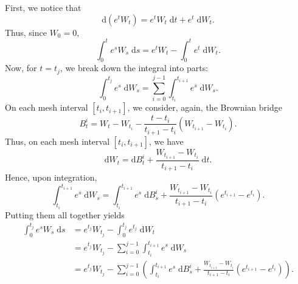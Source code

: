 \documentclass[reqno,12pt]{amsart}
\theoremstyle{plain}%
\theoremstyle{definition}
\begin{document}
First, we notice that
\[
    \mathrm{d}(e^tW_t) = e^t W_t\;\mathrm{d}t + e^t\;\mathrm{d}W_t.
\]
Thus, since $W_0 = 0$,
\[
    \int_0^t e^s W_s \;\mathrm{d}s = e^tW_t - \int_0^t e^t\;\mathrm{d}W_t.
\]
Now, for $t=t_j$, we break down the integral into parts:
\begin{equation}
    \int_0^{t_j} e^s \;\mathrm{d}W_s = \sum_{i = 0}^{j-1} \int_{t_i}^{t_{i+1}} e^s \;\mathrm{d}W_s.
\end{equation}
On each mesh interval $[t_i, t_{i+1}]$, we consider, again, the Brownian bridge
\begin{equation}
    B_t^i = W_t - W_{t_i} - \frac{t - t_i}{t_{i+1}-t_i}(W_{t_{i+1}} - W_{t_i}).
\end{equation}
Thus, on each mesh interval $[t_i, t_{i+1}]$, we have
\[
    \mathrm{d}W_t = \mathrm{d}B_t^i + \frac{W_{t_{i+1}} - W_{t_i}}{t_{i+1}-t_i} \;\mathrm{d}t.
\]
Hence, upon integration,
\[
    \int_{t_i}^{t_{i+1}} e^s \;\mathrm{d}W_s = \int_{t_i}^{t_{i+1}} e^s \;\mathrm{d}B_s^i + \frac{W_{t_{i+1}} - W_{t_i}}{t_{i+1}-t_i}\left(e^{t_{i+1}} - e^{t_i}\right).
\]
Putting them all together yields
\begin{align*}
    \int_0^{t_j} e^s W_s \;\mathrm{d}s & = e^{t_j}W_{t_j} - \int_0^{t_j} e^{t_j}\;\mathrm{d}W_t \\
    & = e^{t_j}W_{t_j} - \sum_{i = 0}^{j-1} \int_{t_i}^{t_{i+1}} e^s \;\mathrm{d}W_s \\
    & = e^{t_j}W_{t_j} - \sum_{i = 0}^{j-1} \left(\int_{t_i}^{t_{i+1}} e^s \;\mathrm{d}B_s^i + \frac{W_{t_{i+1}} - W_{t_i}}{t_{i+1}-t_i}\left(e^{t_{i+1}} - e^{t_i}\right)\right).
\end{align*}
\end{document}
